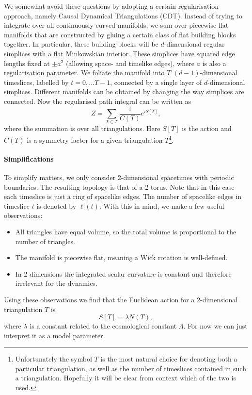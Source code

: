 We somewhat avoid these questions by adopting a certain regularisation approach, namely Causal Dynamical Triangulations (CDT). Instead of trying to integrate over all continuously curved manifolds, we sum over piecewise flat manifolds that are constructed by gluing a certain class of flat building blocks together. In particular, these building blocks will be $d$-dimensional regular simplices with a flat Minkowskian interior. These simplices have squared edge lengths fixed at $\pm a^2$ (allowing space- and timelike edges), where $a$ is also a regularisation parameter. We foliate the manifold into $T$ $(d - 1)$-dimensional timeslices, labelled by $t = 0, \ldots T - 1$, connected by a single layer of $d$-dimensional simplices. Different manifolds can be obtained by changing the way simplices are connected. Now the regularised path integral can be written as
\begin{equation}
    Z
    =
    \sum_{T \in \mathcal{T}} \frac{1}{C(T)} e^{i S[T]}
    ,
\end{equation}
where the summation is over all triangulations. Here $S[T]$ is the action and $C(T)$ is a symmetry factor for a given triangulation $T$\footnote{Unfortunately the symbol $T$ is the most natural choice for denoting both a particular triangulation, as well as the number of timeslices contained in such a triangulation. Hopefully it will be clear from context which of the two is used.}.

\paragraph{Simplifications} To simplify matters, we only consider 2-dimensional spacetimes with periodic boundaries. The resulting topology is that of a 2-torus. Note that in this case each timeslice is just a ring of spacelike edges. The number of spacelike edges in timeslice $t$ is denoted by $\ell(t)$. With this in mind, we make a few useful observations:
\begin{itemize}
    \item All triangles have equal volume, so the total volume is proportional to the number of triangles.
    \item The manifold is piecewise flat, meaning a Wick rotation is well-defined.
    \item In 2 dimensions the integrated scalar curvature is constant and therefore irrelevant for the dynamics.
\end{itemize}
Using these observations we find that the Euclidean action for a 2-dimensional triangulation $T$ is \cite{2012}
\begin{equation}
    S[T] = \lambda N(T),
\end{equation}
where $\lambda$ is a constant related to the cosmological constant $\Lambda$. For now we can just interpret it as a model parameter.

